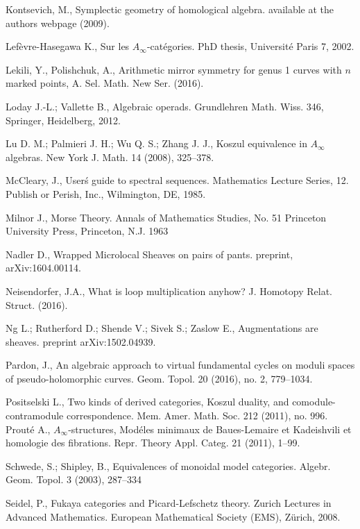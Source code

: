 \documentclass{gtpart}
\begin{document}
\begin{thebibliography}{9999}
     Kontsevich, M., Symplectic geometry of homological algebra. available at the authors webpage (2009). 

 Lef\`evre-Hasegawa K., Sur les $A_\infty$-cat\'egories. PhD thesis,
    Universit\'e Paris 7, 2002.

  Lekili, Y., Polishchuk, A., Arithmetic mirror symmetry for genus 1 curves with $n$ marked points, A. Sel. Math. New Ser. (2016). 
        
 Loday J.-L.; Vallette B., Algebraic operads. Grundlehren Math. Wiss. 346,
        Springer, Heidelberg, 2012. 

 Lu D. M.; Palmieri J. H.; Wu Q. S.; Zhang J. J., Koszul equivalence in   $A_\infty$
	algebras. New York J. Math. 14 (2008), 325--378.


 McCleary, J., User\'s guide to spectral sequences.
Mathematics Lecture Series, 12. Publish or Perish, Inc., Wilmington, DE, 1985.

 Milnor J., Morse Theory. Annals of Mathematics Studies, No. 51 Princeton University Press, Princeton, N.J. 1963

 Nadler D., Wrapped Microlocal Sheaves on pairs of pants. preprint, arXiv:1604.00114. 

 Neisendorfer, J.A., What is loop multiplication anyhow? J. Homotopy Relat. Struct. (2016). 

 Ng L.; Rutherford D.; Shende V.; Sivek S.; Zaslow E., Augmentations
        are sheaves. preprint arXiv:1502.04939.

 Pardon, J., An algebraic approach to virtual fundamental cycles on moduli spaces of pseudo-holomorphic curves. Geom. Topol. 20 (2016), no. 2, 779--1034.

 Positselski L., Two kinds of derived categories, Koszul duality, and
    comodule-contramodule correspondence.  Mem. Amer. Math. Soc. 212 (2011), no. 996. 
 Prout\'e A., $A_\infty$-structures, Mod\'eles minimaux de Baues-Lemaire et
    Kadeishvili et homologie des fibrations. Repr. Theory Appl. Categ. 21 (2011), 1--99. 

  Schwede, S.; Shipley, B., Equivalences of monoidal model categories.
    Algebr. Geom. Topol. 3 (2003), 287--334

 Seidel, P., Fukaya categories and Picard-Lefschetz theory. Zurich Lectures in
    Advanced Mathematics. European Mathematical Society (EMS), Z\"urich, 2008.


\end{thebibliography}
\end{document}
